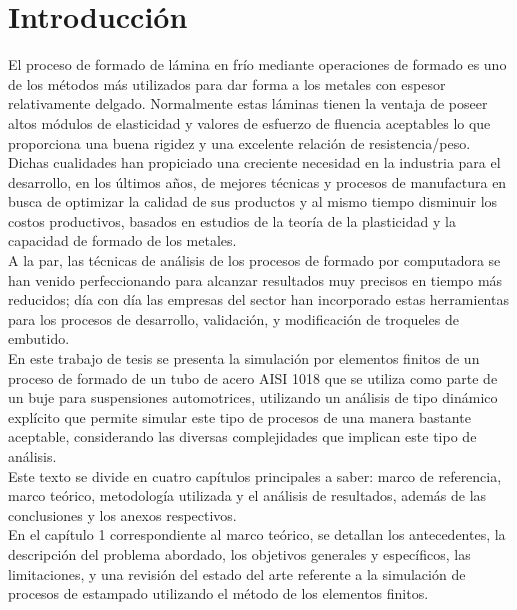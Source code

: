 \chapter*{Introducción}


El proceso de formado de lámina en frío mediante operaciones de formado es uno de los métodos más 
utilizados para dar forma a los metales con espesor relativamente delgado. Normalmente estas láminas 
tienen la ventaja de poseer altos módulos de elasticidad y valores de esfuerzo de fluencia aceptables 
lo que proporciona una buena rigidez y una excelente relación de resistencia/peso. Dichas cualidades 
han propiciado una creciente necesidad en la industria para el desarrollo, en los últimos años, 
de mejores técnicas y procesos de manufactura en busca de optimizar la calidad de sus productos y al 
mismo tiempo disminuir los costos productivos, basados en estudios de la teoría de la plasticidad y la 
capacidad de formado de los metales.\\

A la par, las técnicas de análisis de los procesos de formado por computadora se han venido 
perfeccionando para alcanzar resultados muy precisos en tiempo más reducidos; día con día las 
empresas del sector han incorporado estas herramientas para los procesos de desarrollo, validación, 
y modificación de troqueles de embutido.\\

En este trabajo de tesis se presenta la simulación por elementos finitos de un proceso de formado 
de un tubo de acero AISI 1018 que se utiliza como parte de un buje para suspensiones automotrices, 
utilizando un análisis de tipo dinámico explícito que permite simular este tipo de procesos 
de una manera bastante aceptable, considerando las diversas complejidades que implican este tipo 
de análisis.\\

Este texto se divide en cuatro capítulos principales a saber: marco de referencia, marco teórico, 
metodología utilizada y el análisis de resultados, además de las conclusiones y los anexos respectivos.\\

En el capítulo 1 correspondiente al marco teórico, se detallan los antecedentes, la descripción 
del problema abordado, los objetivos generales y específicos, las limitaciones, y una 
revisión del estado del arte referente a la simulación de procesos de estampado utilizando 
el método de los elementos finitos.\\

